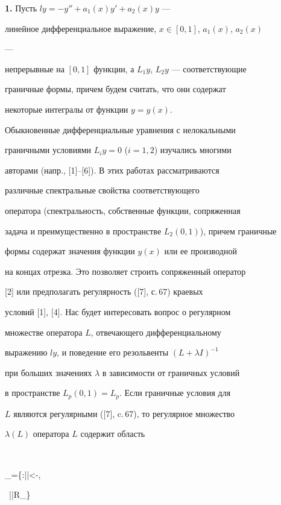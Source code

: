 \label{begin} 


 


{\bf 1.} Пусть $l y=-y''+a_1(x)y'+a_2(x)y$ --- 


линейное дифференциальное выражение, $x\in[0,1]$, $a_1(x)$, $a_2(x)$ 


--- 


непрерывные на $[0,1]$ функции, а $L_1y$, $L_2y$ --- соответствующие 


граничные формы, причем будем считать, что они содержат 


некоторые интегралы от функции $y=y(x)$. 


 


Обыкновенные дифференциальные уравнения с нелокальными 


граничными условиями $L_i y=0$ ($i=1,2$) изучались многими 


авторами (напр., [1]--[6]). В этих работах рассматриваются 


различные спектральные свойства соответствующего  


оператора (спектральность, собственные функции, сопряженная  


задача и преимущественно в пространстве $L_2(0,1)$), причем граничные 


формы содержат значения функции $y(x)$ или ее производной 


на концах отрезка. Это позволяет строить сопряженный оператор 


[2] или предполагать регулярность ([7], с.\,67) краевых 


условий [1], [4]. Нас будет интересовать вопрос о регулярном  


множестве оператора $L$, отвечающего дифференциальному  


выражению $l y$, и поведение его резольвенты $(L+\lambda I)^{-1}$ 


при больших значениях $\lambda$ в зависимости от граничных условий 


в пространстве $L_p(0,1)=L_p$. Если граничные условия для  


$L$ являются регулярными ([7], c.\,67), то регулярное множество 


$\lambda(L)$ оператора $L$ содержит область 


$$ 


\Omega_\varepsilon=\{\lambda:|\arg\lambda|<\pi-\varepsilon, 


\ |\lambda|\ge R_\varepsilon\} 


